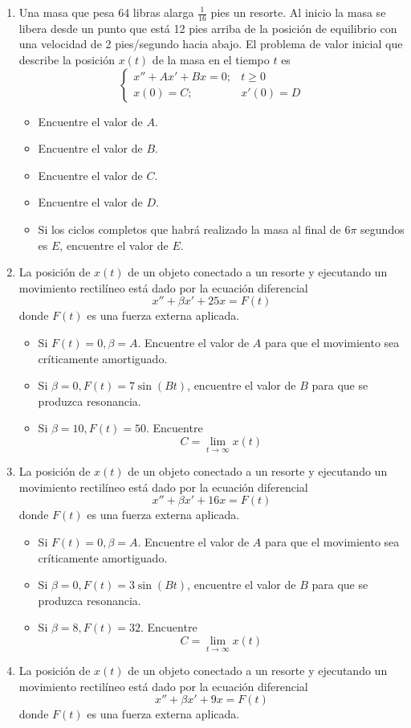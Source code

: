 \begin{enumerate}
\item Una masa que pesa 64 libras alarga $\frac{1}{16}$ pies un resorte. Al inicio la masa se libera desde un punto que está 12 pies arriba de la posición de equilibrio con una velocidad de 2 pies/segundo hacia abajo. El problema de valor inicial que describe la posición $x(t)$ de la masa en el tiempo $t$ es 
$$\begin{cases}     
x'' + Ax' + Bx = 0; & t \geq 0 \\     
x(0) = C; & x'(0) = D 
\end{cases}$$

\begin{itemize}
    \item Encuentre el valor de $A$.
    \item Encuentre el valor de $B$.
    \item Encuentre el valor de $C$.
    \item Encuentre el valor de $D$.
    \item Si los ciclos completos que habrá realizado la masa al final de $6\pi$ segundos es $E$, encuentre el valor de $E$.
\end{itemize}

\item La posición de $x(t)$ de un objeto conectado a un resorte y ejecutando un movimiento rectilíneo está dado por la ecuación diferencial
$$x'' + \beta x' + 25x = F(t)$$
donde $F(t)$ es una fuerza externa aplicada.

\begin{itemize}
    \item Si $F(t) = 0, \beta = A$. Encuentre el valor de $A$ para que el movimiento sea críticamente amortiguado.
    \item Si $\beta = 0, F(t) = 7\sin(Bt)$, encuentre el valor de $B$ para que se produzca resonancia.
    \item Si $\beta = 10, F(t) = 50$. Encuentre $$C = \lim_{t\to \infty} x(t)$$
\end{itemize}

\item La posición de $x(t)$ de un objeto conectado a un resorte y ejecutando un movimiento rectilíneo está dado por la ecuación diferencial
$$x'' + \beta x' + 16x = F(t)$$
donde $F(t)$ es una fuerza externa aplicada.

\begin{itemize}
    \item Si $F(t) = 0, \beta = A$. Encuentre el valor de $A$ para que el movimiento sea críticamente amortiguado.
    \item Si $\beta = 0, F(t) = 3\sin(Bt)$, encuentre el valor de $B$ para que se produzca resonancia.
    \item Si $\beta = 8, F(t) = 32$. Encuentre $$C = \lim_{t\to \infty} x(t)$$
\end{itemize}
\item La posición de $x(t)$ de un objeto conectado a un resorte y ejecutando un movimiento rectilíneo está dado por la ecuación diferencial
$$x'' + \beta x' + 9x = F(t)$$
donde $F(t)$ es una fuerza externa aplicada.


\end{enumerate}
